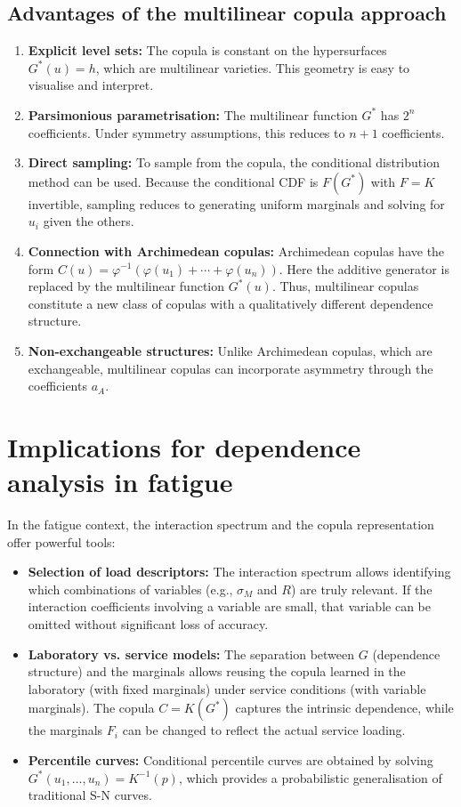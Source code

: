 \subsection{Advantages of the multilinear copula approach}

\begin{enumerate}
    \item \textbf{Explicit level sets:} The copula is constant on the hypersurfaces \(G^*(u)=h\), which are multilinear varieties. This geometry is easy to visualise and interpret.
    \item \textbf{Parsimonious parametrisation:} The multilinear function \(G^*\) has \(2^n\) coefficients. Under symmetry assumptions, this reduces to \(n+1\) coefficients.
    \item \textbf{Direct sampling:} To sample from the copula, the conditional distribution method can be used. Because the conditional CDF is \(F(G^*)\) with \(F=K\) invertible, sampling reduces to generating uniform marginals and solving for \(u_i\) given the others.
    \item \textbf{Connection with Archimedean copulas:} Archimedean copulas have the form \(C(u) = \varphi^{-1}(\varphi(u_1)+\cdots+\varphi(u_n))\). Here the additive generator is replaced by the multilinear function \(G^*(u)\). Thus, multilinear copulas constitute a new class of copulas with a qualitatively different dependence structure.
    \item \textbf{Non-exchangeable structures:} Unlike Archimedean copulas, which are exchangeable, multilinear copulas can incorporate asymmetry through the coefficients \(a_A\).
\end{enumerate}

\section{Implications for dependence analysis in fatigue}
\label{sec:implications-fatigue}

In the fatigue context, the interaction spectrum and the copula representation offer powerful tools:

\begin{itemize}
    \item \textbf{Selection of load descriptors:} The interaction spectrum allows identifying which combinations of variables (e.g., \(\sigma_M\) and \(R\)) are truly relevant. If the interaction coefficients involving a variable are small, that variable can be omitted without significant loss of accuracy.
    \item \textbf{Laboratory vs. service models:} The separation between \(G\) (dependence structure) and the marginals allows reusing the copula learned in the laboratory (with fixed marginals) under service conditions (with variable marginals). The copula \(C=K(G^*)\) captures the intrinsic dependence, while the marginals \(F_i\) can be changed to reflect the actual service loading.
    \item \textbf{Percentile curves:} Conditional percentile curves are obtained by solving \(G^*(u_1,\ldots,u_n)=K^{-1}(p)\), which provides a probabilistic generalisation of traditional S-N curves.
\end{itemize}

